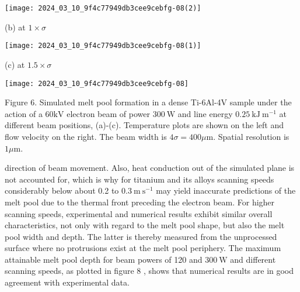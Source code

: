 \documentclass[10pt]{article}
\begin{document}
\begin{center}
\texttt{[image: 2024\_03\_10\_9f4c77949db3cee9cebfg-08(2)]}
\end{center}

(b) at $1 \times \sigma$

\begin{center}
\texttt{[image: 2024\_03\_10\_9f4c77949db3cee9cebfg-08(1)]}
\end{center}

(c) at $1.5 \times \sigma$

\begin{center}
\texttt{[image: 2024\_03\_10\_9f4c77949db3cee9cebfg-08]}
\end{center}

Figure 6. Simulated melt pool formation in a dense Ti-6Al-4V sample under the action of a $60 \mathrm{kV}$ electron beam of power $300 \mathrm{~W}$ and line energy $0.25 \mathrm{~kJ} \mathrm{~m}^{-1}$ at different beam positions, (a)-(c). Temperature plots are shown on the left and flow velocity on the right. The beam width is $4 \sigma=400 \mu \mathrm{m}$. Spatial resolution is $1 \mu \mathrm{m}$.

direction of beam movement. Also, heat conduction out of the simulated plane is not accounted for, which is why for titanium and its alloys scanning speeds considerably below about 0.2 to $0.3 \mathrm{~m} \mathrm{~s}^{-1}$ may yield inaccurate predictions of the melt pool due to the thermal front preceding the electron beam. For higher scanning speeds, experimental and numerical results exhibit similar overall characteristics, not only with regard to the melt pool shape, but also the melt pool width and depth. The latter is thereby measured from the unprocessed surface where no protrusions exist at the melt pool periphery. The maximum attainable melt pool depth for beam powers of 120 and $300 \mathrm{~W}$ and different scanning speeds, as plotted in figure 8 , shows that numerical results are in good agreement with experimental data.
\end{document}
